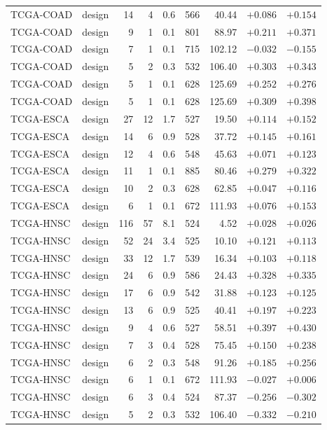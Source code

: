 \begin{longtable}{@{}llrrrrrrr@{}}
TCGA-COAD & design & 14 & 4 & 0.6 & 566 & 40.44 & $+0.086$ & $+0.154$\\
TCGA-COAD & design & 9 & 1 & 0.1 & 801 & 88.97 & $+0.211$ & $+0.371$\\
TCGA-COAD & design & 7 & 1 & 0.1 & 715 & 102.12 & $-0.032$ & $-0.155$\\
TCGA-COAD & design & 5 & 2 & 0.3 & 532 & 106.40 & $+0.303$ & $+0.343$\\
TCGA-COAD & design & 5 & 1 & 0.1 & 628 & 125.69 & $+0.252$ & $+0.276$\\
TCGA-COAD & design & 5 & 1 & 0.1 & 628 & 125.69 & $+0.309$ & $+0.398$\\
TCGA-ESCA & design & 27 & 12 & 1.7 & 527 & 19.50 & $+0.114$ & $+0.152$\\
TCGA-ESCA & design & 14 & 6 & 0.9 & 528 & 37.72 & $+0.145$ & $+0.161$\\
TCGA-ESCA & design & 12 & 4 & 0.6 & 548 & 45.63 & $+0.071$ & $+0.123$\\
TCGA-ESCA & design & 11 & 1 & 0.1 & 885 & 80.46 & $+0.279$ & $+0.322$\\
TCGA-ESCA & design & 10 & 2 & 0.3 & 628 & 62.85 & $+0.047$ & $+0.116$\\
TCGA-ESCA & design & 6 & 1 & 0.1 & 672 & 111.93 & $+0.076$ & $+0.153$\\
TCGA-HNSC & design & 116 & 57 & 8.1 & 524 & 4.52 & $+0.028$ & $+0.026$\\
TCGA-HNSC & design & 52 & 24 & 3.4 & 525 & 10.10 & $+0.121$ & $+0.113$\\
TCGA-HNSC & design & 33 & 12 & 1.7 & 539 & 16.34 & $+0.103$ & $+0.118$\\
TCGA-HNSC & design & 24 & 6 & 0.9 & 586 & 24.43 & $+0.328$ & $+0.335$\\
TCGA-HNSC & design & 17 & 6 & 0.9 & 542 & 31.88 & $+0.123$ & $+0.125$\\
TCGA-HNSC & design & 13 & 6 & 0.9 & 525 & 40.41 & $+0.197$ & $+0.223$\\
TCGA-HNSC & design & 9 & 4 & 0.6 & 527 & 58.51 & $+0.397$ & $+0.430$\\
TCGA-HNSC & design & 7 & 3 & 0.4 & 528 & 75.45 & $+0.150$ & $+0.238$\\
TCGA-HNSC & design & 6 & 2 & 0.3 & 548 & 91.26 & $+0.185$ & $+0.256$\\
TCGA-HNSC & design & 6 & 1 & 0.1 & 672 & 111.93 & $-0.027$ & $+0.006$\\
TCGA-HNSC & design & 6 & 3 & 0.4 & 524 & 87.37 & $-0.256$ & $-0.302$\\
TCGA-HNSC & design & 5 & 2 & 0.3 & 532 & 106.40 & $-0.332$ & $-0.210$\\

\end{longtable}
